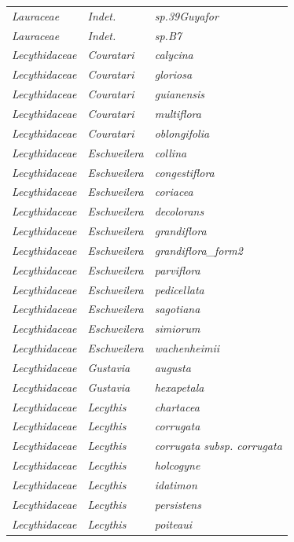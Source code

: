 \documentclass[fleqn,10pt]{ArtEcoFoG} %
\begin{document}
\begin{table}[t]
\begin{tabular}{lll}
\em{Lauraceae} & \em{Indet.} & \em{sp.39Guyafor}\\
\em{Lauraceae} & \em{Indet.} & \em{sp.B7}\\
\addlinespace
\em{Lecythidaceae} & \em{Couratari} & \em{calycina}\\
\em{Lecythidaceae} & \em{Couratari} & \em{gloriosa}\\
\em{Lecythidaceae} & \em{Couratari} & \em{guianensis}\\
\em{Lecythidaceae} & \em{Couratari} & \em{multiflora}\\
\em{Lecythidaceae} & \em{Couratari} & \em{oblongifolia}\\
\addlinespace
\em{Lecythidaceae} & \em{Eschweilera} & \em{collina}\\
\em{Lecythidaceae} & \em{Eschweilera} & \em{congestiflora}\\
\em{Lecythidaceae} & \em{Eschweilera} & \em{coriacea}\\
\em{Lecythidaceae} & \em{Eschweilera} & \em{decolorans}\\
\em{Lecythidaceae} & \em{Eschweilera} & \em{grandiflora}\\
\addlinespace
\em{Lecythidaceae} & \em{Eschweilera} & \em{grandiflora\_form2}\\
\em{Lecythidaceae} & \em{Eschweilera} & \em{parviflora}\\
\em{Lecythidaceae} & \em{Eschweilera} & \em{pedicellata}\\
\em{Lecythidaceae} & \em{Eschweilera} & \em{sagotiana}\\
\em{Lecythidaceae} & \em{Eschweilera} & \em{simiorum}\\
\addlinespace
\em{Lecythidaceae} & \em{Eschweilera} & \em{wachenheimii}\\
\em{Lecythidaceae} & \em{Gustavia} & \em{augusta}\\
\em{Lecythidaceae} & \em{Gustavia} & \em{hexapetala}\\
\em{Lecythidaceae} & \em{Lecythis} & \em{chartacea}\\
\em{Lecythidaceae} & \em{Lecythis} & \em{corrugata}\\
\addlinespace
\em{Lecythidaceae} & \em{Lecythis} & \em{corrugata subsp. corrugata}\\
\em{Lecythidaceae} & \em{Lecythis} & \em{holcogyne}\\
\em{Lecythidaceae} & \em{Lecythis} & \em{idatimon}\\
\em{Lecythidaceae} & \em{Lecythis} & \em{persistens}\\
\em{Lecythidaceae} & \em{Lecythis} & \em{poiteaui}\\

\end{tabular}
\end{table}
\end{document}
